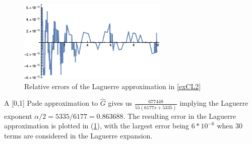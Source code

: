 \begin{figure}
\caption{Relative errors of the Laguerre approximation in \ref{exCL2}}
\begin{center}
\includegraphics [width=2.8in]{err2.eps}
\end{center}
\label{err2}
\end{figure}

A [0,1] Pade approximation to $\hat{G}$ gives us $\frac{677448}{55(6177s + 5335)}$ implying the Laguerre exponent $\alpha/2 = 5335/6177 = 0.863688$. The resulting error in the Laguerre approximation is plotted in (\ref{err2}), with the largest error being $6*10^{-6}$ when 30 terms are considered in the Laguerre expansion.


